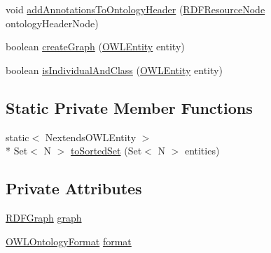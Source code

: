 \begin{DoxyCompactItemize}
\item 
void \hyperlink{classorg_1_1coode_1_1owlapi_1_1rdf_1_1renderer_1_1_r_d_f_renderer_base_a28896288c57bcc042bbfc8f205d5c0da}{add\-Annotations\-To\-Ontology\-Header} (\hyperlink{classorg_1_1coode_1_1owlapi_1_1rdf_1_1model_1_1_r_d_f_resource_node}{R\-D\-F\-Resource\-Node} ontology\-Header\-Node)
\item 
boolean \hyperlink{classorg_1_1coode_1_1owlapi_1_1rdf_1_1renderer_1_1_r_d_f_renderer_base_afce3c481993d018e912a85915cdf8c0c}{create\-Graph} (\hyperlink{interfaceorg_1_1semanticweb_1_1owlapi_1_1model_1_1_o_w_l_entity}{O\-W\-L\-Entity} entity)
\item 
boolean \hyperlink{classorg_1_1coode_1_1owlapi_1_1rdf_1_1renderer_1_1_r_d_f_renderer_base_a12fc51f2b05f33b858e42618186050bb}{is\-Individual\-And\-Class} (\hyperlink{interfaceorg_1_1semanticweb_1_1owlapi_1_1model_1_1_o_w_l_entity}{O\-W\-L\-Entity} entity)
\end{DoxyCompactItemize}
\subsection*{Static Private Member Functions}
\begin{DoxyCompactItemize}
\item 
static$<$ Nextends\-O\-W\-L\-Entity $>$\\*
 Set$<$ N $>$ \hyperlink{classorg_1_1coode_1_1owlapi_1_1rdf_1_1renderer_1_1_r_d_f_renderer_base_a5301423bff851f2698145261093215dd}{to\-Sorted\-Set} (Set$<$ N $>$ entities)
\end{DoxyCompactItemize}
\subsection*{Private Attributes}
\begin{DoxyCompactItemize}
\item 
\hyperlink{classorg_1_1coode_1_1owlapi_1_1rdf_1_1model_1_1_r_d_f_graph}{R\-D\-F\-Graph} \hyperlink{classorg_1_1coode_1_1owlapi_1_1rdf_1_1renderer_1_1_r_d_f_renderer_base_abff8f6e8ad06d29f49987a2371816978}{graph}
\item 
\hyperlink{classorg_1_1semanticweb_1_1owlapi_1_1model_1_1_o_w_l_ontology_format}{O\-W\-L\-Ontology\-Format} \hyperlink{classorg_1_1coode_1_1owlapi_1_1rdf_1_1renderer_1_1_r_d_f_renderer_base_ac803b83f4983e68929a507094c7a7c38}{format}
\end{DoxyCompactItemize}
